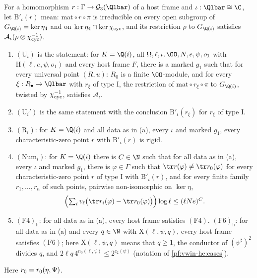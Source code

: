 \begin{definition}\label{pf:eis:Ui}
For a homomorphism $r:\Gamma\to\eisGG(\Qlbar)$ of a host frame and $\iota:\Qlbar\cong\C$, let $\mathrm{B}'_\iota(r)$ mean: $\mathrm{mat}\circ r\circ\pi$
is irreducible on every open subgroup of $G_{\Q(i)}=\ker\eta_4$ and on $\ker\eta_4\cap\ker\chi_{\mathrm{cyc}}$, and its restriction $\rho$ to
$G_{\Q(i)}$ satisfies $\mathcal A_\iota(\rho\otimes\chi_{\mathrm{cyc}}^{-1})$.
\begin{enumerate}[label=(\alph*)]
\item $(\mathrm{U}_i)$ is the statement: for $K=\Q(i)$, all $\Omega,\ell,\iota,\OO,N,e,\psi,o_1$ with $\mathrm{H}(\ell,e,\psi,o_1)$ and every host
  frame $F$, there is a marked $g_1$ such that for every universal point $(R,u)$: $R_0$ is a finite $\OO$-module, and for every
  $\xi:R_\bullet\to\Qlbar$ with $r_\xi$ of type I, the restriction of $\mathrm{mat}\circ r_\xi\circ\pi$ to $G_{\Q(i)}$, twisted by $\chi_{\mathrm{cyc}}^{-1}$,
  satisfies $\mathcal A_\iota$.
\item $(\mathrm{U}_i')$ is the same statement with the conclusion $\mathrm{B}'_\iota(r_\xi)$ for $r_\xi$ of type I.
\item $(\mathrm{R}_i)$: for $K=\Q(i)$ and all data as in (a), every $\iota$ and marked $g_1$, every characteristic-zero point $r$ with
  $\mathrm{B}'_\iota(r)$ is rigid.
\item $(\mathrm{Num}_i)$: for $K=\Q(i)$ there is $C\in\N$ such that for all data as in (a), every $\iota$ and marked $g_1$, there is
  $\varphi\in\Gamma$ such that $\tr r(\varphi)\ne\tr\eisrz(\varphi)$ for every characteristic-zero point $r$ of type I with $\mathrm{B}'_\iota(r)$, and
  for every finite family $r_1,\dots,r_n$ of such points, pairwise non-isomorphic on $\ker\eta$,
  \[\textstyle\Bigl(\sum_i\eisv\bigl(\tr r_i(\varphi)-\tr\eisrz(\varphi)\bigr)\Bigr)\log\ell\le(\ell Ne)^C.\]
\item $(\mathrm{F4})_{\mathrm h}$: for all data as in (a), every host frame satisfies $(\mathrm{F4})$. $(\mathrm{F6})_{\mathrm h}$: for all data
  as in (a) and every $q\in\N$ with $\mathrm{X}(\ell,\psi,q)$, every host frame satisfies $(\mathrm{F6})$; here $\mathrm{X}(\ell,\psi,q)$ means that
  $q\ge1$, the conductor of $(\psi^\sharp)^2$ divides $q$, and $2\ell q\,4^{n_0(\ell,\psi)}\le2^{c_2(\psi)}$ (notation of \cref{pf:vwin-he:cases}).
\end{enumerate}
Here $r_0=r_0(\eta,\Psi)$.
\end{definition}

